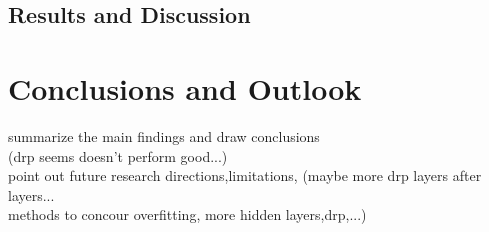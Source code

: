 \documentclass[11pt,a4paper]{article}
\begin{document}
\subsection{Results and Discussion}

\section{Conclusions and Outlook}
summarize the main findings and draw conclusions\\
(drp seems doesn't perform good...)\\
point out future research directions,limitations,
(maybe more drp layers after layers...\\
methods to concour overfitting, more hidden layers,drp,...)

\appendix
\end{document}
